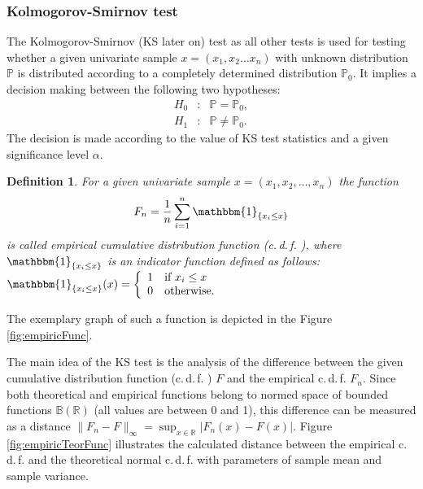 \documentclass[a4paper, 12pt, titlepage, headsepline, listof = totoc, bibliography = totoc, numbers = noenddot]{scrartcl}
\newcommand{\cdf}{c.\,d.\,f. }
\newtheorem{df}{Definition}
\begin{document}
\subsubsection{Kolmogorov-Smirnov test}\label{sec:kolm-smir}
The Kolmogorov-Smirnov (KS later on) test as all other tests is used for testing
whether a given univariate sample $x=(x_1,x_2 \dots x_n)$ with unknown distribution $\mathbb{P}$ is distributed according to a completely determined
distribution $\mathbb{P}_0$. It implies a decision making between the following
two hypotheses:
\[\begin{array}{rcl}
H_0 & : & \mathbb{P} = \mathbb{P}_0,\\
H_1 & : & \mathbb{P} \ne \mathbb{P}_0.
\end{array}\]
The decision is made according to the value of KS test
statistics and a given significance level $\alpha$.

\begin{df}
For a given univariate sample $x=(x_1, x_2, \dots, x_n)$ the function
\[F_n=\frac{1}{n}\sum_{i=1}^n \mathbbm{1}_{\{x_i\le x\}}\] is called empirical
cumulative distribution function (\cdf), where $\mathbbm{1}_{\{x_i\le x\}}$ is an
indicator function defined as follows: $\mathbbm{1}_{\{x_i\le x\}}(x)=\left\lbrace 
\begin{array}{cll}
                 1 & \mbox{if} \ x_i\le x\\
                 0 & \mbox{otherwise}.
\end{array} 
\right.$
\end{df}
The exemplary graph of such a function is depicted in the Figure
\ref{fig:empiricFunc}. 

The main idea of the KS test is the analysis of the difference between the given
cumulative distribution function (\cdf) $F$ and the empirical \cdf $F_n$. Since
both theoretical and empirical functions belong to normed space of bounded
functions $\mathbb{B}(\mathbb{R})$ (all values are between 0 and 1), this difference can be measured as
a distance $\|F_n-F\|_{\infty}=\sup_{x \in \mathbb{R}}|F_n(x)-F(x)|$. Figure
\ref{fig:empiricTeorFunc} illustrates the calculated distance between the
empirical \cdf and the theoretical normal \cdf with parameters of sample mean
and sample variance. 
\end{document}
